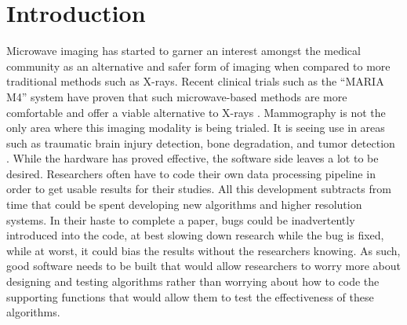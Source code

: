 \section*{Introduction}
Microwave imaging has started to garner an interest amongst the medical community as an alternative and safer form of
imaging when compared to more traditional methods such as X-rays. Recent clinical trials such as the “MARIA M4” system
have proven that such microwave-based methods are more comfortable and offer a viable alternative to X-rays \cite{RN1}.
Mammography is not the only area where this imaging modality is being trialed. It is seeing use in areas such as
traumatic brain injury detection, bone degradation, and tumor detection \cite{RN2}. While the hardware has proved
effective, the software side leaves a lot to be desired. Researchers often have to code their own data processing
pipeline in order to get usable results for their studies. All this development subtracts from time that could be spent
developing new algorithms and higher resolution systems. In their haste to complete a paper, bugs could be inadvertently
introduced into the code, at best slowing down research while the bug is fixed, while at worst, it could bias the
results without the researchers knowing. As such, good software needs to be built that would allow researchers to worry
more about designing and testing algorithms rather than worrying about how to code the supporting functions that would
allow them to test the effectiveness of these algorithms.